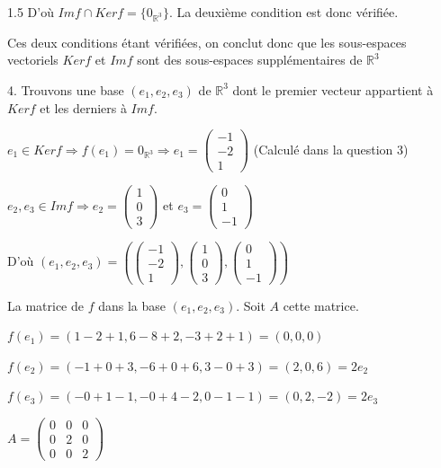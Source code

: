 \documentclass[12pt]{article}
\begin{document}
\begin{spacing}{1.5}
D'où $Imf\cap Kerf=\{0_{\mathbb{R}^3}\}$. La deuxième condition est donc vérifiée.

\medskip
Ces deux conditions étant vérifiées, on conclut donc que les sous-espaces vectoriels $Kerf$ et $Imf$ sont des sous-espaces supplémentaires de $\mathbb{R}^3$


4. Trouvons une base $(e_1,e_2,e_3)$ de $\mathbb{R}^3$ dont le premier vecteur appartient à $Kerf$ et les derniers à $Imf$. 

$e_1\in Kerf\Rightarrow f(e_1)=0_{\mathbb{R}^3}\Longrightarrow e_1=\begin{pmatrix}
-1\\
-2\\
1
\end{pmatrix}$ (Calculé dans la question 3)

$e_2,e_3\in Imf \Longrightarrow e_2=\begin{pmatrix}
1\\
0\\
3
\end{pmatrix}$ et $e_3=\begin{pmatrix}
0 \\
1 \\
-1
\end{pmatrix}$

D'où $(e_1,e_2,e_3)=(\begin{pmatrix}
-1\\
-2\\
1
\end{pmatrix},\begin{pmatrix}
1\\
0\\
3
\end{pmatrix},\begin{pmatrix}
0 \\
1 \\
-1
\end{pmatrix})$

\medskip
La matrice de $f$ dans la base $(e_1,e_2,e_3)$. Soit 	$A$ cette matrice.

$f(e_1)=(1-2+1,6-8+2,-3+2+1)=(0,0,0)$

$f(e_2)=(-1+0+3,-6+0+6,3-0+3)=(2,0,6)=2e_2$

$f(e_3)=(-0+1-1,-0+4-2,0-1-1)=(0,2,-2)=2e_3$

$A=\begin{pmatrix}
0 & 0 & 0 \\ 
0 & 2 & 0 \\ 
0 & 0 & 2
\end{pmatrix} $



\end{spacing}
\end{document}
